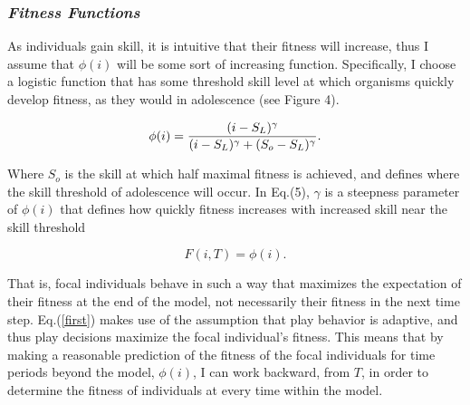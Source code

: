 \documentclass[12pt,letterpaper]{article}
\begin{document}
    \subsubsection{\it Fitness Functions}
      As individuals gain skill, it is intuitive that their fitness will increase, thus I assume that $\phi(i)$ will be some sort of increasing function.     
      Specifically, I choose a logistic function that has some threshold skill level at which organisms quickly develop fitness, as they would in adolescence (see Figure 4).   
      
      \begin{equation}
      \phi(i) = {(i-S_L)^\gamma \over {(i-S_L)^\gamma+(S_o-S_L)^\gamma} }.
      \label{phi}
      \end{equation}
      
      Where $S_o$ is the skill at which half maximal fitness is achieved, and defines where the skill threshold of adolescence will occur.   
      In Eq.(5), $\gamma$ is a steepness parameter of $\phi(i)$ that defines how quickly fitness increases with increased skill near the skill threshold
      
      \begin{equation}
      F(i,T) = \phi(i).
      \label{equivalence}
      \end{equation}
      
      That is, focal individuals behave in such a way that maximizes the expectation of their fitness at the end of the model, not necessarily their fitness in the next time step.
      Eq.(\ref{first}) makes use of the assumption that play behavior is adaptive, and thus play decisions maximize the focal individual's fitness.
      This means that by making a reasonable prediction of the fitness of the focal individuals for time periods beyond the model, $\phi(i)$, I can work backward, from $T$, in order to determine the fitness of individuals at every time within the model.   
      
\end{document}

